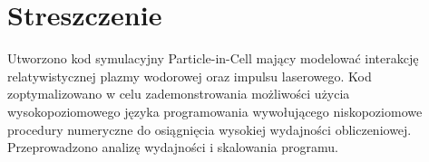 \section{Streszczenie}
Utworzono kod symulacyjny Particle-in-Cell mający modelować interakcję relatywistycznej plazmy wodorowej oraz
impulsu laserowego. Kod zoptymalizowano w celu zademonstrowania możliwości użycia wysokopoziomowego języka programowania
wywołującego niskopoziomowe procedury numeryczne do osiągnięcia wysokiej wydajności obliczeniowej. Przeprowadzono 
analizę wydajności i skalowania programu.
